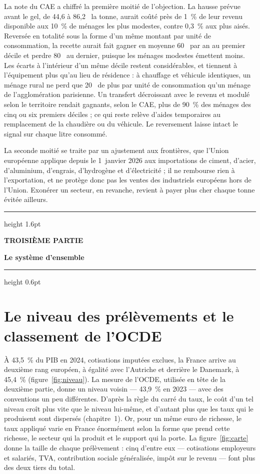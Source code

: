 \documentclass[11pt,a4paper]{article}
\providecommand{\euro}{\texteuro}
\newcommand{\partie}[2]{%
  \clearpage
  \vspace*{0.4cm}
  {\color{bleu}\hrule height 1.6pt}
  \vspace{10pt}
  {\footnotesize\color{ocre}\bfseries\MakeUppercase{#1}\par}
  \vspace{6pt}
  {\fontsize{19}{23}\selectfont\bfseries\color{bleu}#2\par}
  \vspace{8pt}
  {\color{bleu}\hrule height 0.6pt}
  \vspace{16pt}}
\begin{document}
La note du CAE a chiffré la première moitié de l'objection. La hausse prévue avant le gel, de 44,6 à
86,2~\euro{} la tonne, aurait coûté près de 1~\% de leur revenu disponible aux 10~\% de ménages les
plus modestes, contre 0,3~\% aux plus aisés. Reversée en totalité sous la forme d'un même montant par
unité de consommation, la recette aurait fait gagner en moyenne 60~\euro{} par an au premier décile
et perdre 80~\euro{} au dernier, puisque les ménages modestes émettent moins. Les écarts à
l'intérieur d'un même décile restent considérables, et tiennent à l'équipement plus qu'au lieu de
résidence : à chauffage et véhicule identiques, un ménage rural ne perd que 20~\euro{} de plus par
unité de consommation qu'un ménage de l'agglomération parisienne. Un transfert décroissant avec le revenu et modulé selon le territoire rendait
gagnants, selon le CAE, plus de 90~\% des ménages des cinq ou six premiers déciles ; ce qui reste
relève d'aides temporaires au remplacement de la chaudière ou du véhicule. Le reversement laisse
intact le signal sur chaque litre consommé.

La seconde moitié se traite par un ajustement aux frontières, que l'Union européenne applique depuis
le 1\ier{}~janvier 2026 aux importations de ciment, d'acier, d'aluminium, d'engrais, d'hydrogène et
d'électricité ; il ne rembourse rien à l'exportation, et ne protège donc pas les ventes des
industriels européens hors de l'Union. Exonérer un secteur, en revanche, revient à payer plus cher
chaque tonne évitée ailleurs.

\partie{Troisième partie}{Le système d'ensemble}

\section{Le niveau des prélèvements et le classement de l'OCDE}

À 43,5~\% du PIB en 2024, cotisations imputées exclues, la France arrive au deuxième rang européen,
à égalité avec l'Autriche et derrière le Danemark, à 45,4~\% (figure~\ref{fig:niveau}). La mesure de
l'OCDE, utilisée en tête de la deuxième partie, donne un niveau voisin --- 43,9~\% en 2023 --- avec
des conventions un peu différentes. D'après la règle du carré du taux, le coût d'un tel niveau croît
plus vite que le niveau lui-même, et d'autant plus que les taux qui le produisent sont dispersés
(chapitre~1). Or, pour un même euro de richesse, le taux appliqué varie en France énormément selon
la forme que prend cette richesse, le secteur qui la produit et le support qui la porte. La
figure~\ref{fig:carte} donne la taille de chaque prélèvement : cinq d'entre eux --- cotisations
employeurs et salariés, TVA, contribution sociale généralisée, impôt sur le revenu --- font plus
des deux tiers du total.
\end{document}

